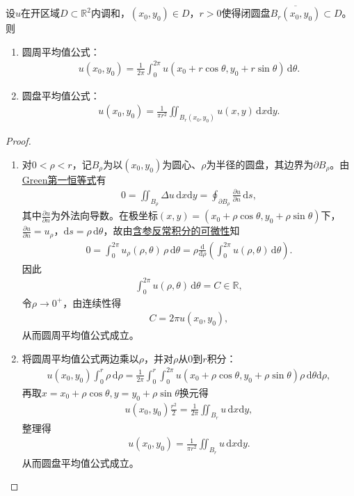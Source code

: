 \documentclass[../../main.tex]{subfiles}%
\begin{document}
\begin{theorem}[调和函数的平均值定理]\label{theorem:数分-调和函数的平均值定理}
设$u$在开区域$D\subset \mathbb{R}^2$内调和，$(x_0,y_0)\in D$，$r>0$使得闭圆盘$\overline{B_r(x_0,y_0)}\subset D$。则
\begin{enumerate}[(1)]
\item 圆周平均值公式：
\begin{align*}
u(x_0,y_0)=\frac{1}{2\pi}\int_{0}^{2\pi} u(x_0+r\cos\theta, y_0+r\sin\theta)\,\mathrm{d}\theta. 
\end{align*}
\item 圆盘平均值公式：
\begin{align*}
u(x_0,y_0)=\frac{1}{\pi r^2}\iint_{B_r(x_0,y_0)} u(x,y)\,\mathrm{d}x\mathrm{d}y. 
\end{align*}
\end{enumerate}
\end{theorem}
\begin{proof}
\begin{enumerate}[(1)]
\item 对$0<\rho<r$，记$B_\rho$为以$(x_0,y_0)$为圆心、$\rho$为半径的圆盘，其边界为$\partial B_\rho$。由\hyperref[theorem:Green第一恒等式]{Green第一恒等式}有
\begin{align*}
0=\iint_{B_\rho} \Delta u\,\mathrm{d}x\mathrm{d}y
=\oint_{\partial B_\rho} \frac{\partial u}{\partial n}\,\mathrm{d}s,
\end{align*}
其中$\frac{\partial u}{\partial n}$为外法向导数。在极坐标$(x,y)=(x_0+\rho\cos\theta, y_0+\rho\sin\theta)$下，$\frac{\partial u}{\partial n}=u_\rho$，$\mathrm{d}s=\rho\,\mathrm{d}\theta$，故由\hyperref[theorem:含参反常积分的可微性]{含参反常积分的可微性}知
\begin{align*}
0=\int_{0}^{2\pi} u_\rho(\rho,\theta)\,\rho\,\mathrm{d}\theta
=\rho \frac{\mathrm{d}}{\mathrm{d}\rho}\left(\int_{0}^{2\pi} u(\rho,\theta)\,\mathrm{d}\theta\right).
\end{align*}
因此
\begin{align*}
\int_{0}^{2\pi} u(\rho,\theta)\,\mathrm{d}\theta = C \in \mathbb{R},
\end{align*}
令$\rho\to 0^+$，由连续性得
\begin{align*}
C=2\pi u(x_0,y_0),
\end{align*}
从而圆周平均值公式成立。

\item 将圆周平均值公式两边乘以$\rho$，并对$\rho$从$0$到$r$积分：
\begin{align*}
u(x_0,y_0)\int_{0}^{r} \rho\,\mathrm{d}\rho
=\frac{1}{2\pi}\int_{0}^{r}\int_{0}^{2\pi} u(x_0+\rho\cos\theta, y_0+\rho\sin\theta)\rho\,\mathrm{d}\theta\mathrm{d}\rho,
\end{align*}
再取$x=x_0+\rho \cos\theta,y=y_0+\rho \sin \theta$换元得
\begin{align*}
u(x_0,y_0)\frac{r^2}{2}
=\frac{1}{2\pi}\iint_{B_r} u\,\mathrm{d}x\mathrm{d}y,
\end{align*}
整理得
\begin{align*}
u(x_0,y_0)=\frac{1}{\pi r^2}\iint_{B_r} u\,\mathrm{d}x\mathrm{d}y.
\end{align*}
从而圆盘平均值公式成立。
\end{enumerate}
\end{proof}
\end{document}
